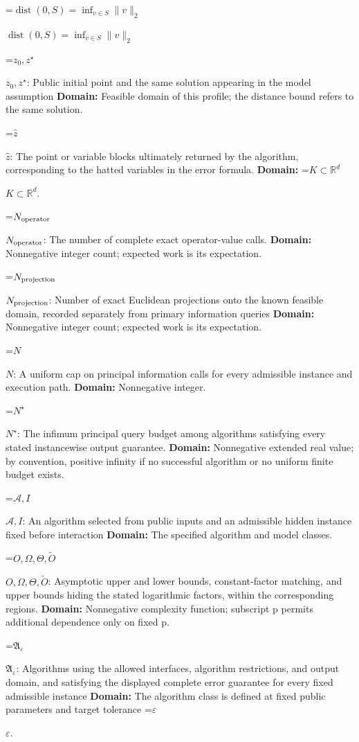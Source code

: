 \documentclass[10pt,a4paper]{article}
\newcommand{\AtlasMath}[1]{\par\begingroup\centering\setbox0=\hbox{$\displaystyle #1$}\ifdim\wd0>1.4\linewidth\typeout{ATLAS WIDE FORMULA: \the\wd0}\fi\ifdim\wd0>\linewidth\resizebox{\linewidth}{!}{\box0}\else\box0\fi\par\endgroup}
\newcommand{\AtlasInlineMath}[1]{\begingroup\setbox0=\hbox{$#1$}\ifdim\wd0>.4\linewidth\endgroup\AtlasMath{#1}\else\endgroup$#1$\fi}
\begin{document}
\AtlasInlineMath{\operatorname{dist}(0,S)=\inf_{v\in S}\|v\|_2}

\AtlasInlineMath{z_0,z^\star}: Public initial point and the same solution appearing in the model assumption \textbf{Domain:} Feasible domain of this profile; the distance bound refers to the same solution.

\AtlasInlineMath{\widehat z}: The point or variable blocks ultimately returned by the algorithm, corresponding to the hatted variables in the error formula. \textbf{Domain:} \AtlasInlineMath{K\subset\mathbb R^d}.

\AtlasInlineMath{N_{\rm operator}}: The number of complete exact operator-value calls. \textbf{Domain:} Nonnegative integer count; expected work is its expectation.

\AtlasInlineMath{N_{\rm projection}}: Number of exact Euclidean projections onto the known feasible domain, recorded separately from primary information queries \textbf{Domain:} Nonnegative integer count; expected work is its expectation.

\AtlasInlineMath{N}: A uniform cap on principal information calls for every admissible instance and execution path. \textbf{Domain:} Nonnegative integer.

\AtlasInlineMath{N^\star}: The infimum principal query budget among algorithms satisfying every stated instancewise output guarantee. \textbf{Domain:} Nonnegative extended real value; by convention, positive infinity if no successful algorithm or no uniform finite budget exists.

\AtlasInlineMath{\mathcal A,I}: An algorithm selected from public inputs and an admissible hidden instance fixed before interaction \textbf{Domain:} The specified algorithm and model classes.

\AtlasInlineMath{O,\Omega,\Theta,\widetilde O}: Asymptotic upper and lower bounds, constant-factor matching, and upper bounds hiding the stated logarithmic factors, within the corresponding regions. \textbf{Domain:} Nonnegative complexity function; subscript p permits additional dependence only on fixed p.

\AtlasInlineMath{\mathfrak A_\varepsilon}: Algorithms using the allowed interfaces, algorithm restrictions, and output domain, and satisfying the displayed complete error guarantee for every fixed admissible instance \textbf{Domain:} The algorithm class is defined at fixed public parameters and target tolerance \AtlasInlineMath{\varepsilon}.
\end{document}
